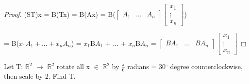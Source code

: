     \begin{proof}
        (ST)x
        = B(Tx)
        = B(Ax)
        = B($\begin{bmatrix}
                A_1 & \hdots & A_n
            \end{bmatrix}
            \begin{bmatrix}
                x_1 \\
                \vdots \\
                x_n
            \end{bmatrix}$)

        \hspace{1cm}
        = B($x_1A_1 + ... + x_nA_n$)
        = $x_1$B$A_1$ + ... + $x_n$B$A_n$
        = $\begin{bmatrix}
            BA_1 & \hdots & BA_n
            \end{bmatrix}
            \begin{bmatrix}
                x_1 \\
                \vdots \\
                x_n
            \end{bmatrix}$
    \end{proof}

    \newpage


    \begin{example}
        Let T: $\mathbb{R}^2$ $\rightarrow$ $\mathbb{R}^2$
        rotate all x $\in$ $\mathbb{R}^2$ by $\frac{\pi}{6}$ radians
        = 30$^{\circ}$ degree
        counterclockwise, then scale by 2. Find T.
    \end{example}


